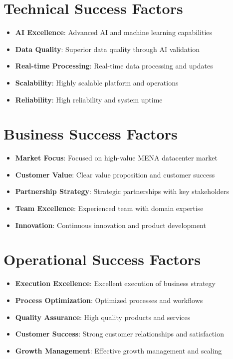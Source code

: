 \documentclass[11pt,a4paper]{book}
\begin{document}
\section{Technical Success Factors}
\begin{itemize}
    \item \textbf{AI Excellence}: Advanced AI and machine learning capabilities
    \item \textbf{Data Quality}: Superior data quality through AI validation
    \item \textbf{Real-time Processing}: Real-time data processing and updates
    \item \textbf{Scalability}: Highly scalable platform and operations
    \item \textbf{Reliability}: High reliability and system uptime
\end{itemize}

\section{Business Success Factors}
\begin{itemize}
    \item \textbf{Market Focus}: Focused on high-value MENA datacenter market
    \item \textbf{Customer Value}: Clear value proposition and customer success
    \item \textbf{Partnership Strategy}: Strategic partnerships with key stakeholders
    \item \textbf{Team Excellence}: Experienced team with domain expertise
    \item \textbf{Innovation}: Continuous innovation and product development
\end{itemize}

\section{Operational Success Factors}
\begin{itemize}
    \item \textbf{Execution Excellence}: Excellent execution of business strategy
    \item \textbf{Process Optimization}: Optimized processes and workflows
    \item \textbf{Quality Assurance}: High quality products and services
    \item \textbf{Customer Success}: Strong customer relationships and satisfaction
    \item \textbf{Growth Management}: Effective growth management and scaling
\end{itemize}
\end{document}
